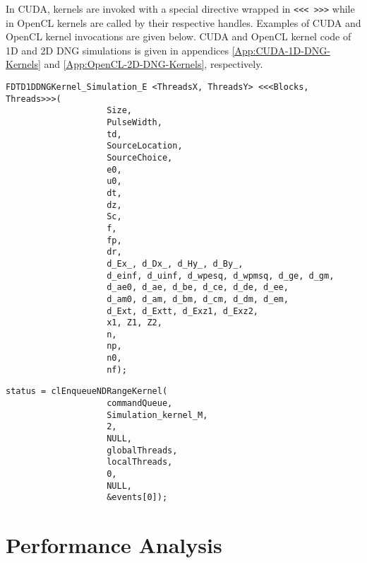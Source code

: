 In CUDA, kernels are invoked with a special directive wrapped in \verb|<<< >>>| while in OpenCL kernels are called by their respective handles. Examples of CUDA and OpenCL kernel invocations are given below. CUDA and OpenCL kernel code of 1D and 2D DNG simulations is given in appendices \ref{App:CUDA-1D-DNG-Kernels} and \ref{App:OpenCL-2D-DNG-Kernels}, respectively.
\label{lst:CUDA-Kernel-Call}
\begin{lstlisting}[caption={CUDA Kernel Call}]
FDTD1DDNGKernel_Simulation_E <ThreadsX, ThreadsY> <<<Blocks, Threads>>>(
					Size,
					PulseWidth,
					td,
					SourceLocation,
					SourceChoice,
					e0,
					u0,
					dt,
					dz,
					Sc,
					f,
					fp,
					dr,
					d_Ex_, d_Dx_, d_Hy_, d_By_,
					d_einf, d_uinf, d_wpesq, d_wpmsq, d_ge, d_gm,
					d_ae0, d_ae, d_be, d_ce, d_de, d_ee,
					d_am0, d_am, d_bm, d_cm, d_dm, d_em,
					d_Ext, d_Extt, d_Exz1, d_Exz2,
					x1, Z1, Z2,
					n,
					np,
					n0,
					nf);
\end{lstlisting}
\label{lst:OpenCL-Kernel-Call}
\begin{lstlisting}[caption={OpenCL Kernel Call}]
status = clEnqueueNDRangeKernel(
					commandQueue,
					Simulation_kernel_M,
					2,
					NULL,
					globalThreads,
					localThreads,
					0,
					NULL,
					&events[0]);
\end{lstlisting}
\section{Performance Analysis}
